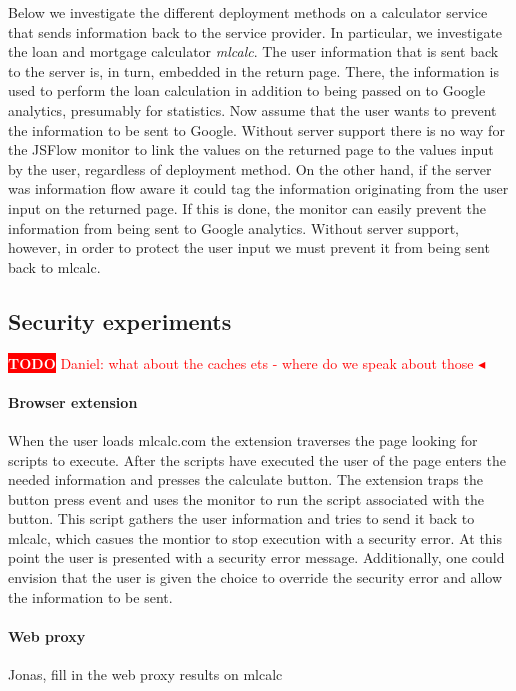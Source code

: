 \documentclass{llncs}
\newcommand{\todo}[1]{\colorbox{red}{\textcolor{white}{\sffamily\bfseries\scriptsize TODO}} \textcolor{red}{#1} \textcolor{red}{$\blacktriangleleft$}}
\begin{document}
Below we investigate the different deployment methods on a calculator service
that sends information back to the service provider. In particular, we
investigate the loan and mortgage calculator \emph{mlcalc}. The user
information that is sent back to the server is, in turn, embedded in the return
page. There, the information is used to perform the loan calculation in
addition to being passed on to Google analytics, presumably for statistics. Now
assume that the user wants to prevent the information to be sent to Google.
Without server support there is no way for the JSFlow monitor to link the
values on the returned page to the values input by the user, regardless of
deployment method. On the other hand, if the server was information flow aware
it could tag the information originating from the user input on the returned
page. If this is done, the monitor can easily prevent the information from
being sent to Google analytics. Without server support, however, in order to
protect the user input we must prevent it from being sent back to mlcalc. 

\subsection{Security experiments}

\todo{Daniel: what about the caches ets - where do we speak about those}
\paragraph{Browser extension}
When the user loads mlcalc.com the extension traverses the page looking for
scripts to execute. After the scripts have executed the user of the page
enters the needed information and presses the calculate button. The extension
traps the button press event and uses the monitor to run the script associated
with the button. This script gathers the user information and tries to send
it back to mlcalc, which casues the montior to stop execution with a security 
error. At this point the user is presented with a security error message. 
Additionally, one could envision that the user is given the choice to
override the security error and allow the information to be sent.


\paragraph{Web proxy}

Jonas, fill in the web proxy results on mlcalc
\end{document}
